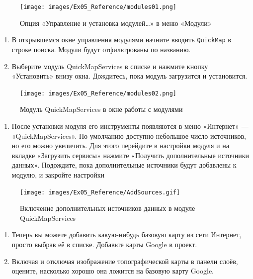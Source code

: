\documentclass[
  12pt,
]{book}
\providecommand{\tightlist}{%
  \setlength{\itemsep}{0pt}\setlength{\parskip}{0pt}}
\begin{document}
\begin{figure}
\centering
\texttt{[image: images/Ex05\_Reference/modules01.png]}
\caption{Опция «Управление и установка модулей\ldots» в меню «Модули»}
\end{figure}

\begin{enumerate}
\def\labelenumi{\arabic{enumi}.}
\setcounter{enumi}{1}
\item
  В открывшемся окне управления модулями начните вводить \texttt{QuickMap} в строке поиска. Модули будут отфильтрованы по названию.
\item
  Выберите модуль QuickMapServices в списке и нажмите кнопку «Установить» внизу окна. Дождитесь, пока модуль загрузится и установится.
\end{enumerate}

\begin{figure}
\centering
\texttt{[image: images/Ex05\_Reference/modules02.png]}
\caption{Модуль QuickMapServices в окне работы с модулями}
\end{figure}

\begin{enumerate}
\def\labelenumi{\arabic{enumi}.}
\setcounter{enumi}{3}
\tightlist
\item
  После установки модуля его инструменты появляются в меню «Интернет» --- «QuickMapServices». По умолчанию доступно небольшое число источников, но его можно увеличить. Для этого перейдите в настройки модуля и на вкладке «Загрузить сервисы» нажмите «Получить дополнительные источники данных». Подождите, пока дополнительные источники будут добавлены к модулю, и закройте настройки
\end{enumerate}

\begin{figure}
\centering
\texttt{[image: images/Ex05\_Reference/AddSources.gif]}
\caption{Включение дополнительных источников данных в модуле QuickMapServices}
\end{figure}

\begin{enumerate}
\def\labelenumi{\arabic{enumi}.}
\setcounter{enumi}{4}
\item
  Теперь вы можете добавить какую-нибудь базовую карту из сети Интернет, просто выбрав её в списке. Добавьте карты Google в проект.
\item
  Включая и отключая изображение топографической карты в панели слоёв, оцените, насколько хорошо она ложится на базовую карту Google.
\end{enumerate}
\end{document}
